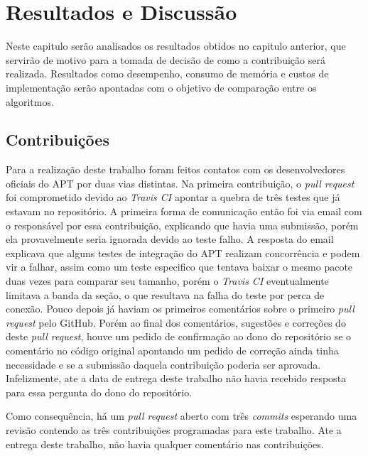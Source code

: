 
\chapter{Resultados e Discussão} %
\label{cha:analise_de_resultados}

Neste capitulo serão analisados os resultados obtidos no capitulo anterior, que servirão de motivo para a tomada de decisão de como a contribuição será realizada. Resultados como desempenho, consumo de memória e custos de implementação serão apontadas com o objetivo de comparação entre os algoritmos.

\section{Contribuições} %
\label{sec:contribui_es}

Para a realização deste trabalho foram feitos contatos com os desenvolvedores oficiais do {\code APT} por duas vias distintas. Na primeira contribuição, o \textit{pull request} foi comprometido devido ao \textit{Travis CI} apontar a quebra de três testes que já estavam no repositório. A primeira forma de comunicação então foi via email com o responsável por essa contribuição, explicando que havia uma submissão, porém ela provavelmente seria ignorada devido ao teste falho. A resposta do email explicava que alguns testes de integração do {\code APT} realizam concorrência e podem vir a falhar, assim como um teste especifico que tentava baixar o mesmo pacote duas vezes para comparar seu tamanho, porém o \textit{Travis CI} eventualmente limitava a banda da seção, o que resultava na falha do teste por perca de conexão. Pouco depois já haviam os primeiros comentários sobre o primeiro \textit{pull request} pelo GitHub. Porém ao final dos comentários, sugestões e correções do deste \textit{pull request}, houve um pedido de confirmação ao dono do repositório se o comentário no código original apontando um pedido de correção ainda tinha necessidade e se a submissão daquela contribuição poderia ser aprovada. Infelizmente, ate a data de entrega deste trabalho não havia recebido resposta para essa pergunta do dono do repositório.

Como consequência, há um \textit{pull request} aberto com três \textit{commits} esperando uma revisão contendo as três contribuições programadas para este trabalho. Ate a entrega deste trabalho, não havia qualquer comentário nas contribuições.







